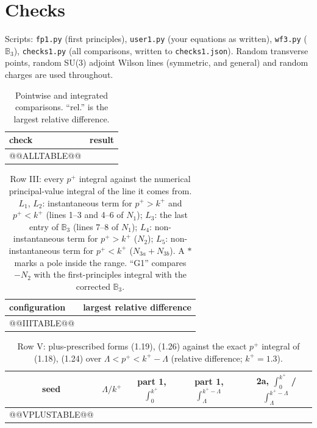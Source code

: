 \documentclass[10pt]{article}
\numberwithin{equation}{section}
\def\mf#1{\mathbb{#1}}
\begin{document}
\section{Checks}\label{sec:checks}
Scripts: \texttt{fp1.py} (first principles), \texttt{user1.py} (your equations as written), \texttt{wf3.py} ($\mf B_3$), \texttt{checks1.py} (all comparisons, written to \texttt{checks1.json}). Random transverse points, random SU(3) adjoint Wilson lines (symmetric, and general) and random charges are used throughout.
\begin{longtable}{@{}p{}p{}@{}}
\caption{Pointwise and integrated comparisons. ``rel.'' is the largest relative difference.}\label{tab:all}\\\toprule
check & result\\\midrule
@@ALLTABLE@@
\bottomrule
\end{longtable}
\begin{longtable}{@{}p{}p{}@{}}
\caption{Row III: every $p^+$ integral against the numerical principal-value integral of the line it comes from. $L_1$, $L_2$: instantaneous term for $p^+>k^+$ and $p^+<k^+$ (lines 1--3 and 4--6 of $N_1$); $L_3$: the last entry of $\mf B_3$ (lines 7--8 of $N_1$); $L_4$: non-instantaneous term for $p^+>k^+$ ($N_2$); $L_5$: non-instantaneous term for $p^+<k^+$ ($N_{3a}+N_{3b}$). A $\ast$ marks a pole inside the range. ``G1'' compares $-N_2$ with the first-principles integral with the corrected $\mf B_3$.}\label{tab:III}\\\toprule
configuration & largest relative difference\\\midrule
@@IIITABLE@@
\bottomrule
\end{longtable}
\begin{table}[H]\centering\small
\begin{tabular}{@{}ccccc@{}}\toprule
seed & $\Lambda/k^+$ & part 1, $\int_0^{k^+}$ & part 1, $\int_\Lambda^{k^+-\Lambda}$ & 2a, $\int_0^{k^+}$ \quad / \quad $\int_\Lambda^{k^+-\Lambda}$\\\midrule
@@VPLUSTABLE@@
\bottomrule\end{tabular}
\caption{Row V: plus-prescribed forms (1.19), (1.26) against the exact $p^+$ integral of (1.18), (1.24) over $\Lambda<p^+<k^+-\Lambda$ (relative difference; $k^+=1.3$).}\label{tab:Vplus}
\end{table}
\end{document}
